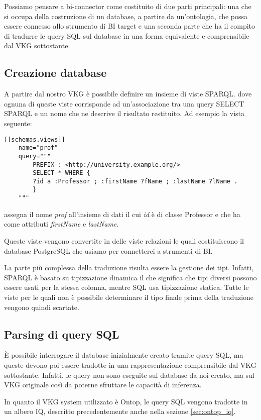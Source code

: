 Possiamo pensare a bi-connector come costituito di due parti principali: una che si occupa della costruzione di un database, a partire da un'ontologia, che possa essere connesso allo strumento di BI target e una seconda parte che ha il compito di tradurre le query
SQL sul database in una forma equivalente e comprensibile dal VKG sottostante.

\subsection{Creazione database}
\label{sec:bi-connector_db}
A partire dal nostro VKG è possibile definire un insieme di viste SPARQL. 
dove ognuna di queste viste corrisponde ad un'associazione tra una query SELECT SPARQL e un nome che ne descrive il risultato restituito. Ad esempio la vista seguente:
\begin{verbatim}
[[schemas.views]]
    name="prof"
    query="""
        PREFIX : <http://university.example.org/>
        SELECT * WHERE {
        ?id a :Professor ; :firstName ?fName ; :lastName ?lName .
        }
    """
\end{verbatim}
assegna il nome \textit{prof} all'insieme di dati il cui \textit{id} è di classe Professor e che ha come attributi \textit{firstName} e \textit{lastName}.

Queste viste vengono convertite in delle viste relazioni le quali costituiscono il database PostgreSQL che usiamo per connetterci a strumenti di BI.

La parte più complessa della traduzione risulta essere la gestione dei tipi. Infatti, SPARQL è basato su tipizzazione dinamica il che significa che tipi diversi possono essere usati per la stessa colonna, mentre SQL usa 
tipizzazione statica. Tutte le viste per le quali non è possibile determinare il tipo finale prima della traduzione vengono quindi scartate.

\subsection{Parsing di query SQL}
\label{sec:bi-connector_parsing}
\`E possibile interrogare il database inizialmente creato tramite query SQL, ma queste devono poi essere tradotte in una rappresentazione comprensibile dal VKG sottostante. Infatti, le query non sono eseguite sul database da noi creato, ma sul
VKG originale così da poterne sfruttare le capacità di inferenza.

In quanto il VKG system utilizzato è Ontop, le query SQL vengono tradotte in un albero IQ, descritto precedentemente anche nella sezione \ref{sec:ontop_iq}.

